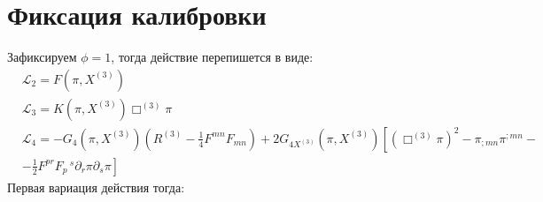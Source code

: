 \documentclass[12pt,a4paper,svgnames]{extarticle}
\begin{document}
\section{Фиксация калибровки}
Зафиксируем $\phi = 1$, тогда действие перепишется в виде:
\begin{align*}
	& \mathcal{L}_{2} = F\left(\pi, X^{(3)}\right)\\
	& \mathcal{L}_{3} = K\left(\pi, X^{(3)}\right)\Box^{(3)}\pi\\
	& \mathcal{L}_{4} = -G_4(\pi,X^{(3)})\left( R^{(3)}-\frac{1}{4}F^{mn}F_{mn}\right) + 2G_{4X^{(3)}}(\pi,X^{(3)})\left[\left(\Box^{(3)}\pi\right)^2 - \pi_{;mn}\pi^{;mn} -\right.\\
	&\left.- \frac{1}{2}F^{p r} F_{p}\,^{s} \partial_{r}{\pi} \partial_{s}{\pi} \right]
\end{align*}
Первая вариация действия тогда:
\end{document}
